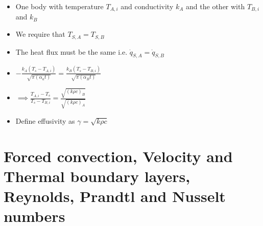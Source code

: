 \documentclass[12pt]{article}
\begin{document}
\begin{itemize}
\begin{itemize}
        \item One body with temperature $T_{A, i}$ and conductivity $k_A$ and the other with $T_{B, i}$ and $k_B$
        \item We require that $T_{S, A} = T_{S, B}$
        \item The heat flux must be the same i.e. $\dot{q}_{S, A} = \dot{q}_{S, B}$
        \item $- \frac{k_A (T_s - T_{A, i})}{\sqrt{\pi (\alpha_a t)}} = \frac{k_B (T_s - T_{B, i})}{\sqrt{\pi (\alpha_B t)}} $
        \item $\implies \frac{T_{A, i} - T_s}{T_s - T_{B, i}} = \frac{\sqrt{(k \rho c)_B}}{\sqrt{(k \rho c)_A}}$
        \item Define effusivity as $\gamma = \sqrt{k \rho c}$
    \end{itemize}
\end{itemize}

\section{Forced convection, Velocity and Thermal boundary layers, Reynolds, Prandtl and Nusselt numbers}
\end{document}
